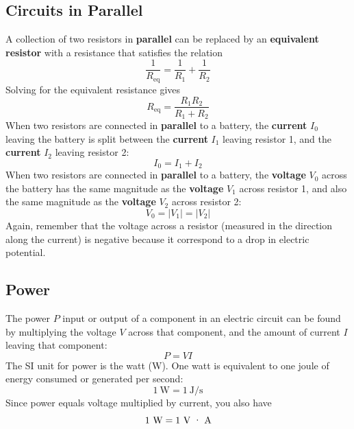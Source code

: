 \subsection{Circuits in Parallel}
%
A collection of two resistors in \textbf{parallel} can be replaced by an \textbf{equivalent resistor} with a resistance that satisfies the relation
\begin{equation}
	\frac{1}{R_{\text{eq}}} = \frac{1}{R_{1}} + \frac{1}{R_{2}}
\end{equation}
Solving for the equivalent resistance gives
\begin{equation} \label{eq.03.RParallel}
	R_{\text{eq}} = \frac{R_{1} R_{2}}{R_{1} + R_{2}}
\end{equation}
When two resistors are connected in \textbf{parallel} to a battery, the \textbf{current} $I_{0}$ leaving the battery is split between the \textbf{current} $I_{1}$ leaving resistor 1, and the \textbf{current} $I_{2}$ leaving resistor 2:
\begin{equation} \label{eq.03.IParallel}
	I_{0} = I_{1} + I_{2}
\end{equation}
When two resistors are connected in \textbf{parallel} to a battery, the \textbf{voltage} $V_{0}$ across the battery has the same magnitude as the \textbf{voltage} $V_{1}$ across resistor 1, and also the same magnitude as the \textbf{voltage} $V_{2}$ across resistor 2:
\begin{equation} \label{eq.03.VParallel}
	V_{0} = \left| V_{1} \right| = \left| V_{2} \right|
\end{equation}
Again, remember that the voltage across a resistor (measured in the direction along the current) is negative because it correspond to a drop in electric potential.
%
\subsection{Power}
%
The power $P$ input or output of a component in an electric circuit can be found by multiplying the voltage $V$ across that component, and the amount of current $I$ leaving that component:
\begin{equation}
	P = VI
\end{equation}
The SI unit for power is the watt (W). One watt is equivalent to one joule of energy consumed or generated per second:
\begin{equation}
	1 \ \text{W} = 1 \ \text{J/s}
\end{equation}
Since power equals voltage multiplied by current, you also have
\begin{equation}
	1 \ \text{W} = 1 \ \text{V{ }\textperiodcentered{ }A}
\end{equation}
%
